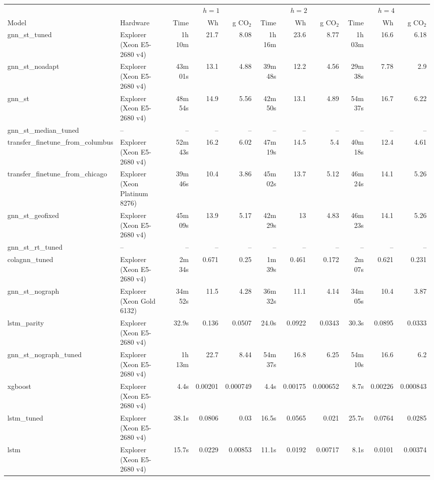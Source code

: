 \begin{tabular}{llrrrrrrrrr}
\toprule
 & & \multicolumn{3}{c}{$h=1$} & \multicolumn{3}{c}{$h=2$} & \multicolumn{3}{c}{$h=4$} \\
\cmidrule(lr){3-5} \cmidrule(lr){6-8} \cmidrule(lr){9-11}
Model & Hardware & Time & Wh & g CO$_2$ & Time & Wh & g CO$_2$ & Time & Wh & g CO$_2$ \\
\midrule
gnn\_st\_tuned & Explorer (Xeon E5-2680 v4) & 1h 10m & 21.7 & 8.08 & 1h 16m & 23.6 & 8.77 & 1h 03m & 16.6 & 6.18 \\
gnn\_st\_noadapt & Explorer (Xeon E5-2680 v4) & 43m 01s & 13.1 & 4.88 & 39m 48s & 12.2 & 4.56 & 29m 38s & 7.78 & 2.9 \\
gnn\_st & Explorer (Xeon E5-2680 v4) & 48m 54s & 14.9 & 5.56 & 42m 50s & 13.1 & 4.89 & 54m 37s & 16.7 & 6.22 \\
gnn\_st\_median\_tuned & – & -- & -- & -- & -- & -- & -- & -- & -- & -- \\
transfer\_finetune\_from\_columbus & Explorer (Xeon E5-2680 v4) & 52m 43s & 16.2 & 6.02 & 47m 19s & 14.5 & 5.4 & 40m 18s & 12.4 & 4.61 \\
transfer\_finetune\_from\_chicago & Explorer (Xeon Platinum 8276) & 39m 46s & 10.4 & 3.86 & 45m 02s & 13.7 & 5.12 & 46m 24s & 14.1 & 5.26 \\
gnn\_st\_geofixed & Explorer (Xeon E5-2680 v4) & 45m 09s & 13.9 & 5.17 & 42m 29s & 13 & 4.83 & 46m 23s & 14.1 & 5.26 \\
gnn\_st\_rt\_tuned & – & -- & -- & -- & -- & -- & -- & -- & -- & -- \\
colagnn\_tuned & Explorer (Xeon E5-2680 v4) & 2m 34s & 0.671 & 0.25 & 1m 39s & 0.461 & 0.172 & 2m 07s & 0.621 & 0.231 \\
gnn\_st\_nograph & Explorer (Xeon Gold 6132) & 34m 52s & 11.5 & 4.28 & 36m 32s & 11.1 & 4.14 & 34m 05s & 10.4 & 3.87 \\
lstm\_parity & Explorer (Xeon E5-2680 v4) & 32.9s & 0.136 & 0.0507 & 24.0s & 0.0922 & 0.0343 & 30.3s & 0.0895 & 0.0333 \\
gnn\_st\_nograph\_tuned & Explorer (Xeon E5-2680 v4) & 1h 13m & 22.7 & 8.44 & 54m 37s & 16.8 & 6.25 & 54m 10s & 16.6 & 6.2 \\
xgboost & Explorer (Xeon E5-2680 v4) & 4.4s & 0.00201 & 0.000749 & 4.4s & 0.00175 & 0.000652 & 8.7s & 0.00226 & 0.000843 \\
lstm\_tuned & Explorer (Xeon E5-2680 v4) & 38.1s & 0.0806 & 0.03 & 16.5s & 0.0565 & 0.021 & 25.7s & 0.0764 & 0.0285 \\
lstm & Explorer (Xeon E5-2680 v4) & 15.7s & 0.0229 & 0.00853 & 11.1s & 0.0192 & 0.00717 & 8.1s & 0.0101 & 0.00374 \\

\end{tabular}
